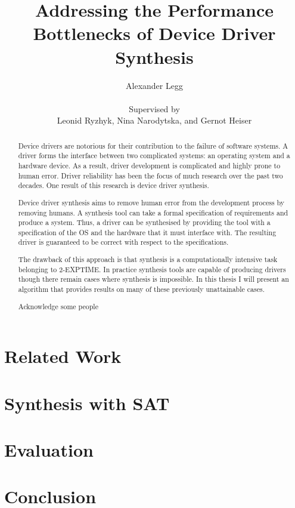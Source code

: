 \documentclass[a4paper, twoside, openright, 11pt, oldfontcommands]{memoir}
\title{Addressing the Performance Bottlenecks of Device Driver Synthesis}
\author{Alexander Legg \\
    \\
    Supervised by \\
Leonid Ryzhyk, Nina Narodytska, and Gernot Heiser}
\begin{document}
\maketitle

\setcounter{secnumdepth}{3}
\setcounter{tocdepth}{3}
\tableofcontents

\begin{abstract}

Device drivers are notorious for their contribution to the failure of software
systems. A driver forms the interface between two complicated systems: an
operating system and a hardware device. As a result, driver development is
complicated and highly prone to human error. Driver reliability has been the
focus of much research over the past two decades. One result of this research
is device driver synthesis.

Device driver synthesis aims to remove human error from the development process
by removing humans. A synthesis tool can take a formal specification of
requirements and produce a system. Thus, a driver can be synthesised by
providing the tool with a specification of the OS and the hardware that it must
interface with. The resulting driver is guaranteed to be correct with respect
to the specifications.

The drawback of this approach is that synthesis is a computationally intensive
task belonging to 2-EXPTIME. In practice synthesis tools are capable of
producing drivers though there remain cases where synthesis is impossible. In
this thesis I will present an algorithm that provides results on many of these
previously unattainable cases.

\end{abstract}

\renewcommand{\abstractname}{Acknowledgements}
\begin{abstract}
Acknowledge some people
\end{abstract}





\chapter{Related Work}
\label{ch:relatedwork}



\chapter{Synthesis with SAT}

\chapter{Evaluation}

\chapter{Conclusion}



\end{document}
